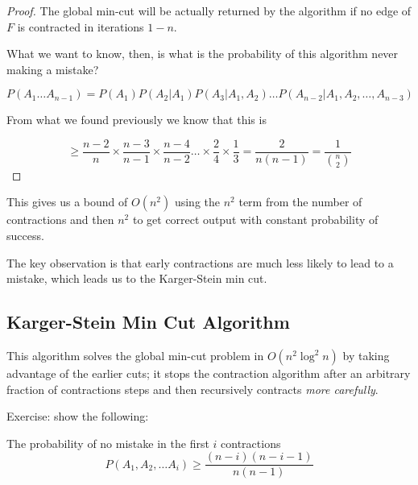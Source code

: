 \documentclass[../notes.tex]{subfiles}
\begin{document}
\begin{lemma}
\begin{proof}
  The global min-cut will be actually returned by the algorithm if no edge of $ F $ is contracted in iterations $  1 - n $.

  What we want to know, then, is what is the probability of this algorithm never making a mistake?


  \begin{equation}
    P(A_1 \ldots A_{n-1}) = P(A_1)P(A_2 | A_1) P(A_3 | A_1, A_2) \ldots P(A_{n-2} | A_1, A_2, \ldots, A_{n-3})
  \end{equation}

  From what we found previously we know that this is 

  \begin{equation}
    \ge \frac{n-2}{n} \times \frac{n-3}{n-1} \times \frac{n-4}{n-2} \ldots \times \frac{2}{4} \times \frac{1}{3}  = \frac{2}{n(n-1)} =  \frac{1}{\binom{n}{2}}
  \end{equation}

  \end{proof}

  This gives us a bound of $ O(n^2) $ using the $ n^2 $ term from the number of contractions and then $ n^2 $ to get correct output with constant probability of success.

\end{lemma}


The key observation is that early contractions are much less likely to lead to a mistake, which leads us to the Karger-Stein min cut. 

\subsection{Karger-Stein Min Cut Algorithm}

This algorithm solves the global min-cut problem in $ O(n^2 \log^2 n) $ by taking advantage of the earlier cuts; it stops the contraction algorithm after an arbitrary fraction of contractions steps and then recursively contracts \textit{more carefully}.


\begin{blockquote}

Exercise: show the following:


The probability of no mistake in the first $ i $ contractions
\begin{equation}
  P(A_1, A_2, \ldots A_i) \ge \frac{(n-i)(n-i-1)}{n(n-1)}
\end{equation}
    
\end{blockquote}
\end{document}
